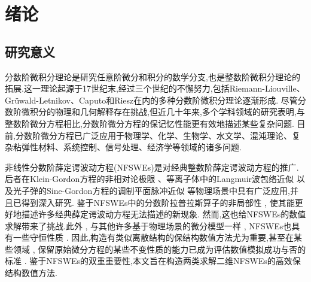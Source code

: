 \chapter[绪论]{绪论}

\section{研究意义}

分数阶微积分理论是研究任意阶微分和积分的数学分支,也是整数阶微积分理论的拓展.这一理论起源于17世纪末,经过三个世纪的不懈努力,包括Riemann-Liouville、Grüwald-Letnikov、Caputo和Riesz在内的多种分数阶微积分理论逐渐形成\cite{samkoFractionalIntegralsDerivatives1993}.
尽管分数阶微积分的物理和几何解释存在挑战,但近几十年来,多个学科领域的研究表明,与整数阶微分方程相比,分数阶微分方程的保记忆性能更有效地描述某些复杂问题.
目前,分数阶微分方程已广泛应用于物理学、化学、生物学、水文学、混沌理论、复杂粘弹性材料、系统控制、信号处理、经济学等领域的诸多问题\cite{liIntroductionFractionalCalculus2015,HandbookDifferentialEquations2008,brychkovIndefiniteIntegrals2008,zhangMassBalanceBased2005,carrerasAnomalousDiffusionExit2001,maginSolvingFractionalOrder2009,zaslavskySelfsimilarTransportIncomplete1993,sunRandomorderFractionalDifferential2011}.%

非线性分数阶薛定谔波动方程(NFSWEs)是对经典整数阶薛定谔波动方程的推广.
后者在Klein-Gordon方程的非相对论极限 \cite{tsutsumiNonrelativisticApproximationNonlinear1984,machiharaNonrelativisticLimitEnergy2002}、等离子体中的Langmuir波包络近似 \cite{colinSemidiscretizationTimeNonlinear1998}
以及光子弹的Sine-Gordon方程的调制平面脉冲近似 \cite{baoComparisonsSineGordonPerturbed2010,xinModelingLightBullets2000}等物理场景中具有广泛应用,并且已得到深入研究\cite{zhangConservativeNumericalScheme2003,baoUniformErrorEstimates2012,chengSeveralConservativeCompact2018,brugnanoClassEnergyconservingHamiltonian2018}.
鉴于NFSWEs中的分数阶拉普拉斯算子的非局部性 , 使其能更好地描述许多经典薛定谔波动方程无法描述的新现象.
然而,这也给NFSWEs的数值求解带来了挑战.此外 , 与其他许多基于物理场景的微分模型一样 , NFSWEs也具有一些守恒性质 . 
因此,构造有类似离散结构的保结构数值方法尤为重要,甚至在某些领域 , 保留原始微分方程的某些不变性质的能力已成为评估数值模拟成功与否的标准 \cite{liFiniteDifferenceCalculus1995,fengHamilton1991}.
鉴于NFSWEs的双重重要性,本文旨在构造两类求解二维NFSWEs的高效保结构数值方法.

